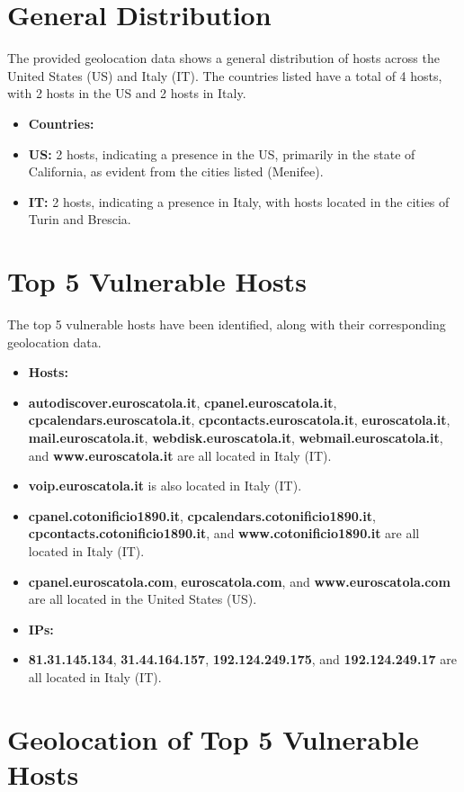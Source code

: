 \section{General Distribution}

The provided geolocation data shows a general distribution of hosts across the United States (US) and Italy (IT). The countries listed have a total of 4 hosts, with 2 hosts in the US and 2 hosts in Italy.
\begin{itemize}
\item \textbf{Countries:}
\item \textbf{US:} 2 hosts, indicating a presence in the US, primarily in the state of California, as evident from the cities listed (Menifee).
\item \textbf{IT:} 2 hosts, indicating a presence in Italy, with hosts located in the cities of Turin and Brescia.
\end{itemize}
\section{Top 5 Vulnerable Hosts}

The top 5 vulnerable hosts have been identified, along with their corresponding geolocation data.
\begin{itemize}
\item \textbf{Hosts:}
\item \textbf{autodiscover.euroscatola.it}, \textbf{cpanel.euroscatola.it}, \textbf{cpcalendars.euroscatola.it}, \textbf{cpcontacts.euroscatola.it}, \textbf{euroscatola.it}, \textbf{mail.euroscatola.it}, \textbf{webdisk.euroscatola.it}, \textbf{webmail.euroscatola.it}, and \textbf{www.euroscatola.it} are all located in Italy (IT).
\item \textbf{voip.euroscatola.it} is also located in Italy (IT).
\item \textbf{cpanel.cotonificio1890.it}, \textbf{cpcalendars.cotonificio1890.it}, \textbf{cpcontacts.cotonificio1890.it}, and \textbf{www.cotonificio1890.it} are all located in Italy (IT).
\item \textbf{cpanel.euroscatola.com}, \textbf{euroscatola.com}, and \textbf{www.euroscatola.com} are all located in the United States (US).
\item \textbf{IPs:}
\item \textbf{81.31.145.134}, \textbf{31.44.164.157}, \textbf{192.124.249.175}, and \textbf{192.124.249.17} are all located in Italy (IT).
\end{itemize}
\section{Geolocation of Top 5 Vulnerable Hosts}

